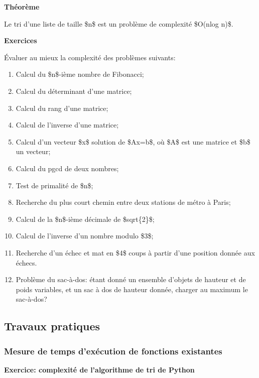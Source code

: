 \textbf{Théorème}

Le tri d'une liste de taille \$n\$ est un problème de complexité
\$O(nlog n)\$.

\textbf{Exercices}

Évaluer au mieux la complexité des problèmes suivants:

\begin{enumerate}
\item
  Calcul du \$n\$-ième nombre de Fibonacci;
\item
  Calcul du déterminant d'une matrice;
\item
  Calcul du rang d'une matrice;
\item
  Calcul de l'inverse d'une matrice;
\item
  Calcul d'un vecteur \$x\$ solution de \$Ax=b\$, où \$A\$ est une
  matrice et \$b\$ un vecteur;
\item
  Calcul du pgcd de deux nombres;
\item
  Test de primalité de \$n\$;
\item
  Recherche du plus court chemin entre deux stations de métro à Paris;
\item
  Calcul de la \$n\$-ième décimale de \$sqrt\{2\}\$;
\item
  Calcul de l'inverse d'un nombre modulo \$3\$;
\item
  Recherche d'un échec et mat en \$4\$ coups à partir d'une position
  donnée aux échecs.
\item
  Problème du sac-à-dos: étant donné un ensemble d'objets de hauteur et
  de poids variables, et un sac à dos de hauteur donnée, charger au
  maximum le sac-à-dos?
\end{enumerate}

\subsection{Travaux pratiques}

\subsubsection{Mesure de temps d'exécution de fonctions existantes}

\textbf{Exercice: complexité de l'algorithme de tri de Python}

